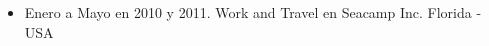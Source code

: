 \begin{itemize}
 \item Enero a Mayo en 2010 y 2011. Work and Travel en Seacamp Inc. Florida - USA
\end{itemize}
